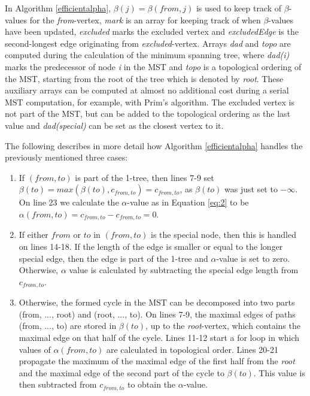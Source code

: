 \documentclass[english, 12pt, a4paper, sci, utf8, a-1b, online]{aaltothesis}
\begin{document}
In Algorithm \ref{efficientalpha}, $\beta(j) = \beta(from, j)$ is used to keep track of $\beta$-values for the \textit{from}-vertex, \textit{mark} is an array for keeping track of when $\beta$-values have been updated, \textit{excluded} marks the excluded vertex and \textit{excludedEdge} is the second-longest edge originating from \textit{excluded}-vertex. Arrays \textit{dad} and \textit{topo} are computed during the calculation of the minimum spanning tree, where \textit{dad(i)} marks the predecessor of node \textit{i} in the MST and \textit{topo} is a topological ordering of the MST, starting from the root of the tree which is denoted by \textit{root}. These auxiliary arrays can be computed at almost no additional cost during a serial MST computation, for example, with Prim's algorithm. The excluded vertex is not part of the MST, but can be added to the topological ordering as the last value and \textit{dad(special)} can be set as the closest vertex to it.

The following describes in more detail how Algorithm \ref{efficientalpha} handles the previously mentioned three cases:
\begin{enumerate}
	\item If $(from, to)$ is part of the 1-tree, then lines 7-9 set $\beta(to) = max(\beta(to), c_{from, to}) = c_{from, to}$, as $\beta(to)$ was just set to $-\infty$. On line 23 we calculate the $\alpha$-value as in Equation \ref{eq:2} to be $\alpha(from, to) = c_{from, to} - c_{from, to} = 0$.
	\item If either $from$ or $to$ in $(from, to)$ is the special node, then this is handled on lines 14-18. If the length of the edge is smaller or equal to the longer special edge, then the edge is part of the 1-tree and $\alpha$-value is set to zero. Otherwise, $\alpha$ value is calculated by subtracting the special edge length from $c_{from, to}$.
	\item Otherwise, the formed cycle in the MST can be decomposed into two parts (from, ..., root) and (root, ..., to). On lines 7-9, the maximal edges of paths (from, ..., to) are stored in $\beta(to)$, up to the \textit{root}-vertex, which contains the maximal edge on that half of the cycle. Lines 11-12 start a for loop in which values of $\alpha(from, to)$ are calculated in topological order. Lines 20-21 propagate the maximum of the maximal edge of the first half from the \textit{root} and the maximal edge of the second part of the cycle to $\beta(to)$. This value is then subtracted from $c_{from, to}$ to obtain the $\alpha$-value.
\end{enumerate}
\end{document}
